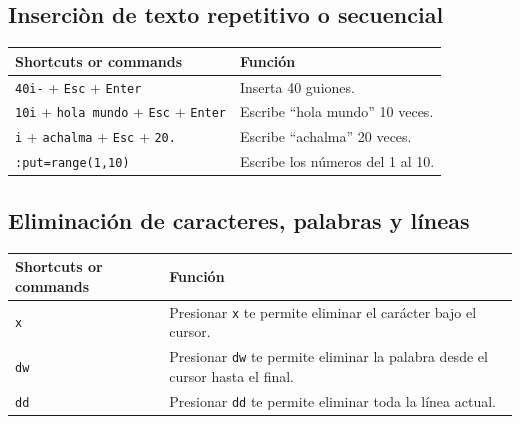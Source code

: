 \documentclass[
  doc,
  floatsintext,
  longtable,
  a4paper,
  nolmodern,
  notxfonts,
  notimes,
  12pt,
  colorlinks=true,linkcolor=blue,citecolor=blue,urlcolor=blue]{apa7}
\newcounter{none} %
\begin{document}
\subsection{Inserciòn de texto repetitivo o
secuencial}\label{inserciuxf2n-de-texto-repetitivo-o-secuencial}

{\def\LTcaptype{none} %
\begin{longtable}[]{@{}
  >{\raggedright\arraybackslash}p{}
  >{\raggedright\arraybackslash}p{}@{}}
\toprule\noalign{}
\begin{minipage}[b]{\linewidth}\raggedright
Shortcuts or commands
\end{minipage} & \begin{minipage}[b]{\linewidth}\raggedright
Función
\end{minipage} \\
\midrule\noalign{}
\endhead
\bottomrule\noalign{}
\endlastfoot
\texttt{40i-} + \texttt{Esc} + \texttt{Enter} & Inserta 40 guiones. \\
\texttt{10i} + \texttt{hola\ mundo} + \texttt{Esc} + \texttt{Enter} &
Escribe ``hola mundo'' 10 veces. \\
\texttt{i} + \texttt{achalma} + \texttt{Esc} + \texttt{20.} & Escribe
``achalma'' 20 veces. \\
\texttt{:put=range(1,10)} & Escribe los números del 1 al 10. \\
\end{longtable}
}

\subsection{Eliminación de caracteres, palabras y
líneas}\label{eliminaciuxf3n-de-caracteres-palabras-y-luxedneas}

{\def\LTcaptype{none} %
\begin{longtable}[]{@{}
  >{\raggedright\arraybackslash}p{}
  >{\raggedright\arraybackslash}p{}@{}}
\toprule\noalign{}
\begin{minipage}[b]{\linewidth}\raggedright
Shortcuts or commands
\end{minipage} & \begin{minipage}[b]{\linewidth}\raggedright
Función
\end{minipage} \\
\midrule\noalign{}
\endhead
\bottomrule\noalign{}
\endlastfoot
\texttt{x} & Presionar \texttt{x} te permite eliminar el carácter bajo
el cursor. \\
\texttt{dw} & Presionar \texttt{dw} te permite eliminar la palabra desde
el cursor hasta el final. \\
\texttt{dd} & Presionar \texttt{dd} te permite eliminar toda la línea
actual. \\
\end{longtable}
}
\end{document}
